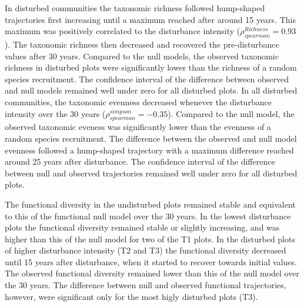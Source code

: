 \documentclass[fleqn,10pt]{ArtEcoFoG} %
\begin{document}
In disturbed communities the taxonomic richness followed hump-shaped trajectories first increasing until a maximum reached after around 15 years.
This maximum was positively correlated to the disturbance intensity (\(\rho^{Richness}_{spearman}=0.93\)).
The taxonomic richness then decreased and recovered the pre-disturbance values after 30 years.
Compared to the null models, the observed taxonomic richness in disturbed plots were significantly lower than the richness of a random species recruitment.
The confidence interval of the difference between observed and null models remained well under zero for all disturbed plots.
In all disturbed communities, the taxonomic evenness decreased whenever the disturbance intensity over the 30 years (\(\rho^{simpson}_{spearman}=-0.35\)).
Compared to the null model, the observed taxonomic eveness was significantly lower than the evenness of a random species recruitment.
The difference between the observed and null model evenness followed a hump-shaped trajectory with a maximum difference reached around 25 years after disturbance.
\color{red}
The confidence interval of the difference between null and observed trajectories remained well under zero for all disturbed plots.
\color{black}

The functional diversity in the undisturbed plots remained stable and equivalent to this of the functional null model over the 30 years.
In the lowest disturbance plots the functional diversity remained stable or slightly increasing, and was higher than this of the null model for two of the T1 plots.
In the disturbed plots of higher disturbance intensity (T2 and T3) the functional diversity decreased until 15 years after disturbance, when it started to recover towards initial values.
The observed functional diversity remained lower than this of the null model over the 30 years.
\color{red}
The difference between null and observed functional trajectories, however, were significant only for the most higly disturbed plots (T3).
\color{black}
\end{document}
